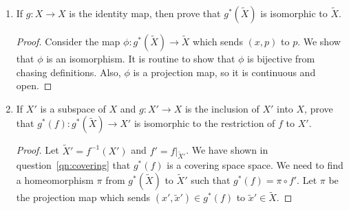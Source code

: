 \documentclass{article}
\begin{document}
\begin{enumerate}
\begin{enumerate}
      \item If $g:X\rightarrow X$ is the identity map, then prove that
        $g^*(\tilde{X})$ is isomorphic to $\tilde{X}$.
        \begin{proof}
          Consider the map $\phi:g^*(\tilde{X})\rightarrow\tilde{X}$ which
          sends $(x,p)$ to $p$. We show that $\phi$ is an isomorphism.
          It is routine to show that $\phi$ is bijective from chasing
          definitions. Also, $\phi$ is a projection map, so it is
          continuous and open.
        \end{proof}

      \item If $X'$ is a subspace of $X$ and $g:X'\rightarrow X$ is the
        inclusion of $X'$ into $X$, prove that
        $g^*(f):g^*(\tilde{X})\rightarrow X'$ is isomorphic to the
        restriction of $f$ to $X'$.

        \begin{proof}
          Let $\tilde{X}'=f^{-1}(X')$ and $f'=f|_{\tilde{X}'}$. We have
          shown in question~\ref{qn:covering} that $g^*(f)$ is a covering
          space space. We need to find a homeomorphism $\pi$ from
          $g^*(\tilde{X})$ to $\tilde{X}'$ such that $g^*(f)=\pi\circ f'$.
          Let $\pi$ be the projection map which sends $(x',\tilde{x}')\in
          g^*(f)$ to $\tilde{x}'\in\tilde{X}$.
        \end{proof}
    \end{enumerate}
\end{enumerate}
\end{document}
